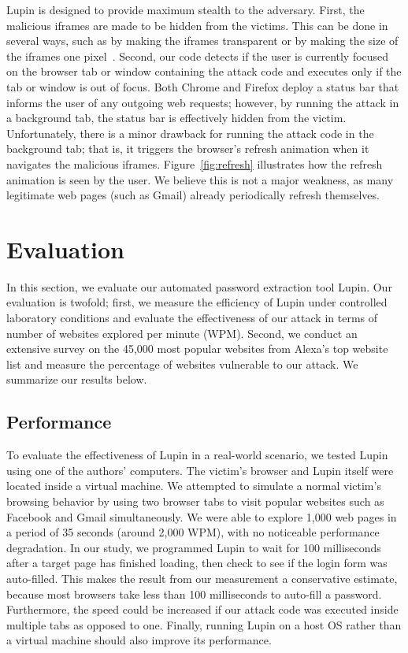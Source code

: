 \documentclass[letterpaper,twocolumn,10pt]{article}
\begin{document}
Lupin is designed to provide maximum stealth to the adversary. First, 
the malicious iframes are made to be hidden from the victims. This can 
be done in several ways, such as by making the iframes transparent or 
by making the size of the iframes one pixel~\cite{framebusting}. 
Second, our code detects if the user is currently focused on the 
browser tab or window containing the attack code and executes only if 
the tab or window is out of focus. Both Chrome and Firefox deploy a 
status bar that informs the user of any outgoing web requests; 
however, by running the attack in a background tab, the status bar is 
effectively hidden from the victim. Unfortunately, there is a minor 
drawback for running the attack code in the background tab; that is, 
it triggers the browser's refresh animation when it navigates the 
malicious iframes. Figure~\ref{fig:refresh} illustrates how the 
refresh animation is seen by the user. We believe this is not a major 
weakness, as many legitimate web pages (such as Gmail) already 
periodically refresh themselves. 

\section{Evaluation}
\label{sec:evaluation}
In this section, we evaluate our automated password extraction tool 
Lupin. Our evaluation is twofold; first, we measure the efficiency of 
Lupin under controlled laboratory conditions and evaluate the 
effectiveness of our attack in terms of number of websites explored 
per minute (WPM). Second, we conduct an extensive survey on the 45,000 
most popular websites from Alexa's top website list and measure 
the percentage of websites vulnerable to our attack. We summarize our 
results below.

\subsection{Performance}
To evaluate the effectiveness of Lupin in a real-world scenario, we 
tested Lupin using one of the authors' computers. The victim's browser 
and Lupin itself were located inside a virtual machine. We attempted 
to simulate a normal victim's browsing behavior by using two browser 
tabs to visit popular websites such as Facebook and Gmail 
simultaneously. We were able to explore 1,000 web pages in a period of 
35 seconds (around 2,000 WPM), with no noticeable performance 
degradation. In our study, we programmed Lupin to wait for 100 
milliseconds after a target page has finished loading, then check to 
see if the login form was auto-filled. This makes the result from our 
measurement a conservative estimate, because most browsers take less 
than 100 milliseconds to auto-fill a password. Furthermore, the speed 
could be increased if our attack code was executed inside multiple tabs 
as opposed to one. Finally, running Lupin on a host OS rather than a 
virtual machine should also improve its performance.
\end{document}
